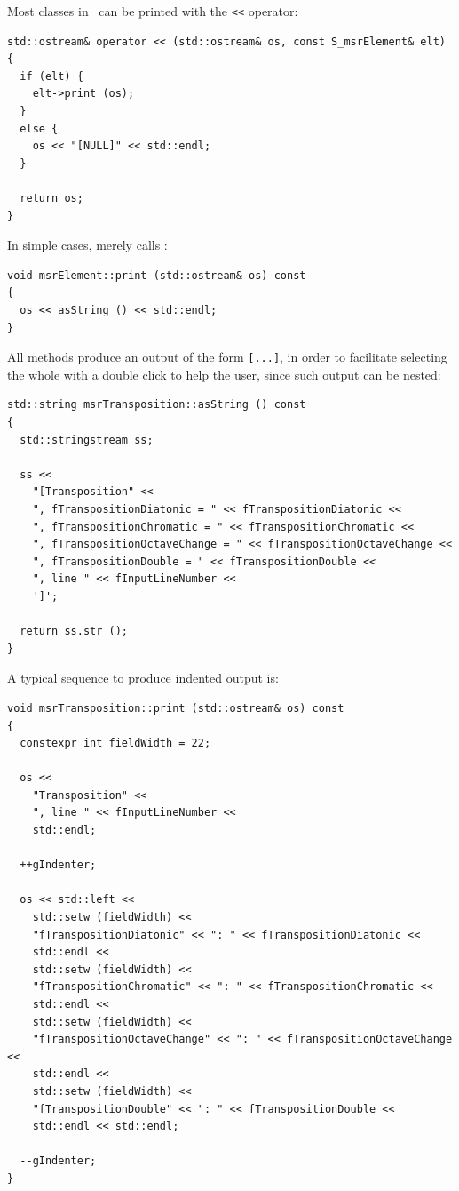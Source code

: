 Most classes in \mf\ can be printed with the {\tt <<} operator:
\begin{lstlisting}[language=CPlusPlus]
std::ostream& operator << (std::ostream& os, const S_msrElement& elt)
{
  if (elt) {
    elt->print (os);
  }
  else {
    os << "[NULL]" << std::endl;
  }

  return os;
}
\end{lstlisting}

In simple cases,  merely calls :
\begin{lstlisting}[language=CPlusPlus]
void msrElement::print (std::ostream& os) const
{
  os << asString () << std::endl;
}
\end{lstlisting}

All  methods produce an output of the form {\tt [...]}, in order to facilitate selecting the whole with a double click to help the user, since such output can be nested:
\begin{lstlisting}[language=CPlusPlus]
std::string msrTransposition::asString () const
{
  std::stringstream ss;

  ss <<
    "[Transposition" <<
    ", fTranspositionDiatonic = " << fTranspositionDiatonic <<
    ", fTranspositionChromatic = " << fTranspositionChromatic <<
    ", fTranspositionOctaveChange = " << fTranspositionOctaveChange <<
    ", fTranspositionDouble = " << fTranspositionDouble <<
    ", line " << fInputLineNumber <<
    ']';

  return ss.str ();
}
\end{lstlisting}

A typical sequence to produce indented output is:
\begin{lstlisting}[language=CPlusPlus]
void msrTransposition::print (std::ostream& os) const
{
  constexpr int fieldWidth = 22;

  os <<
    "Transposition" <<
    ", line " << fInputLineNumber <<
    std::endl;

  ++gIndenter;

  os << std::left <<
    std::setw (fieldWidth) <<
    "fTranspositionDiatonic" << ": " << fTranspositionDiatonic <<
    std::endl <<
    std::setw (fieldWidth) <<
    "fTranspositionChromatic" << ": " << fTranspositionChromatic <<
    std::endl <<
    std::setw (fieldWidth) <<
    "fTranspositionOctaveChange" << ": " << fTranspositionOctaveChange <<
    std::endl <<
    std::setw (fieldWidth) <<
    "fTranspositionDouble" << ": " << fTranspositionDouble <<
    std::endl << std::endl;

  --gIndenter;
}
\end{lstlisting}

